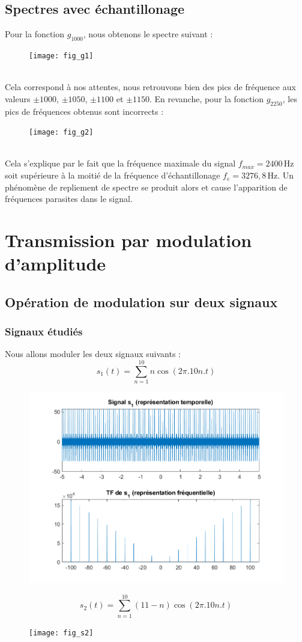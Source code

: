 \documentclass{article}
\begin{document}
\subsection{Spectres avec échantillonage}
Pour la fonction $g_{1000}$, nous obtenons le spectre suivant :
\begin{figure}[h]
\texttt{[image: fig\_g1]}
\centering
\end{figure} \\
Cela correspond à nos attentes, nous retrouvons bien des pics de fréquence aux valeurs $\pm1000$, $\pm1050$, $\pm1100$ et $\pm1150$.
En revanche, pour la fonction $g_{2250}$, les pics de fréquences obtenus sont incorrects :
\begin{figure}[h]
\texttt{[image: fig\_g2]}
\centering
\end{figure} \\
Cela s'explique par le fait que la fréquence maximale du signal $f_{max}=2400\,\mathrm{Hz}$ soit supérieure à la moitié de la fréquence d'échantillonage $f_e=3276,8 \,\mathrm{Hz}$. Un phénomène de repliement de spectre se produit alors et cause l'apparition de fréquences parasites dans le signal.
\section{Transmission par modulation d'amplitude}
\subsection{Opération de modulation sur deux signaux}
\subsubsection{Signaux étudiés}
Nous allons moduler les deux signaux suivants :
$$ s_1(t) = \sum_{n=1}^{10}n\cos(2\pi.10n.t)$$
\begin{figure}[h]
\includegraphics[scale=0.5]{fig_s1}
\centering
\end{figure}
$$ s_2(t)=\sum_{n=1}^{10}(11-n)\cos(2\pi.10n.t)$$
\begin{figure}[h]
\texttt{[image: fig\_s2]}
\centering
\end{figure}
\end{document}
